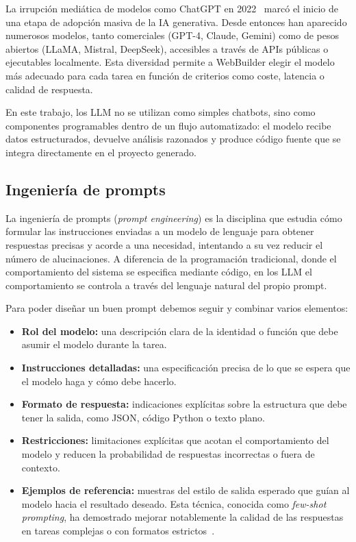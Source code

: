 La irrupción mediática de modelos como ChatGPT en 2022~\cite{chatgpt_launch} marcó 
el inicio de una etapa de adopción masiva de la IA generativa. Desde entonces han 
aparecido numerosos modelos, tanto comerciales (GPT-4, Claude, Gemini) como de 
pesos abiertos (LLaMA, Mistral, DeepSeek), accesibles a través de APIs públicas 
o ejecutables localmente. Esta diversidad permite a WebBuilder elegir el modelo 
más adecuado para cada tarea en función de criterios como coste, latencia o 
calidad de respuesta.

En este trabajo, los LLM no se utilizan como simples chatbots, sino como componentes programables dentro de un flujo automatizado: el modelo recibe datos estructurados, devuelve análisis razonados y produce código fuente que se integra directamente en el proyecto generado.


\subsection{Ingeniería de prompts}
\label{subsec:prompts}

La ingeniería de prompts (\emph{prompt engineering}) es la disciplina que estudia cómo formular las instrucciones enviadas a un modelo de lenguaje para obtener respuestas precisas y acorde a una necesidad, intentando a su vez reducir el número de alucinaciones. A diferencia de la programación tradicional, donde el comportamiento del sistema se especifica mediante código, en los LLM el comportamiento se controla a través del lenguaje natural del propio prompt.

Para poder diseñar un buen prompt debemos seguir y combinar varios elementos: 

\begin{itemize}
    \item \textbf{Rol del modelo:} una descripción clara de la identidad o 
    función que debe asumir el modelo durante la tarea.
    \item \textbf{Instrucciones detalladas:} una especificación precisa de 
    lo que se espera que el modelo haga y cómo debe hacerlo.
    \item \textbf{Formato de respuesta:} indicaciones explícitas sobre la 
    estructura que debe tener la salida, como JSON, código Python o texto 
    plano.
    \item \textbf{Restricciones:} limitaciones explícitas que acotan el 
    comportamiento del modelo y reducen la probabilidad de respuestas 
    incorrectas o fuera de contexto.
    \item \textbf{Ejemplos de referencia:} muestras del estilo de salida 
    esperado que guían al modelo hacia el resultado deseado. Esta técnica, 
    conocida como \emph{few-shot prompting}, ha demostrado mejorar 
    notablemente la calidad de las respuestas en tareas complejas o con 
    formatos estrictos~\cite{openai_prompt_engineering}.
\end{itemize}


